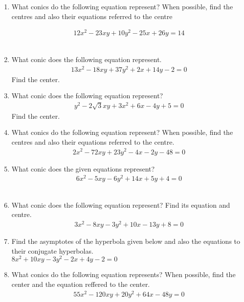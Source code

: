 \renewcommand{\theequation}{\theenumi}
\renewcommand{\thefigure}{\theenumi}
\begin{enumerate}[label=\thesubsection.\arabic*.,ref=\thesubsection.\theenumi]
%
\item What conics do the following equation represent? When possible, find the centres and also their equations referred to the centre

\begin{align}
12x^2-23xy+10y^2-25x+26y=14\label{eq:solutions/40/1/ques}
\end{align}
\\
\solution

\item What conic does the following equation represent. 
\begin{align}
13x^2-18xy+37y^2+2x+14y-2 = 0
\end{align}
Find the center.
\\
\solution

%
\item What conic does the following equation represent?
\begin{align}
y^2-2\sqrt{3}xy+3x^2+6x-4y+5 = 0
\end{align}
Find the center.
\\
\solution

\item What conics do the following equation represent? When possible, find the centres and also their equations referred to the centre.
\begin{align}
2x^2-72xy+23y^2-4x-2y-48=0\label{eq:solutions/40/4/ques}
\end{align}
\solution
%
\item What conic does the given equations represent?
\begin{align}
6x^2-5xy-6y^2+14x+5y+4=0
\end{align}
\\
\solution

\item What conic does the following equation represent? Find its equation and centre.
\begin{align*}
	3x^2 - 8xy - 3y^2 + 10x - 13y + 8 =0 
\end{align*}
\solution

%
\item Find the asymptotes of the hyperbola given below and also the equations to their conjugate hyperbolas.\\
$8x^2+10xy-3y^2-2x+4y-2=0$
%
\solution

%
\item What conics do the following equation represents? When possible, find the center and the equation reffered to the center.
\begin{multline}
55x^2 - 120xy + 20y^2 +64x -48y=0
\label{eq:solutions/40/9/eqn1}
\end{multline}
%
\solution

\end{enumerate}


